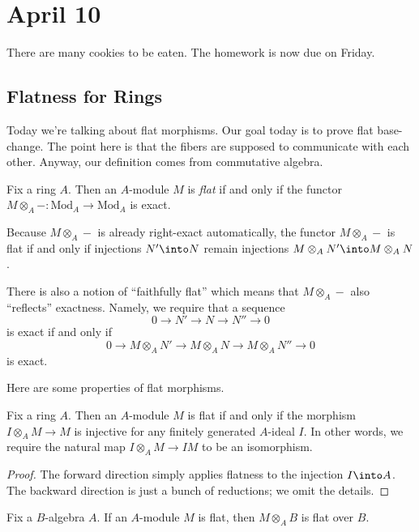 \documentclass[../notes.tex]{subfiles}
\begin{document}
\section{April 10}

There are many cookies to be eaten. The homework is now due on Friday.

\subsection{Flatness for Rings}
Today we're talking about flat morphisms. Our goal today is to prove flat base-change. The point here is that the fibers are supposed to communicate with each other. Anyway, our definition comes from commutative algebra.
\begin{definition}[flat]
	Fix a ring $A$. Then an $A$-module $M$ is \textit{flat} if and only if the functor $M\otimes_A-\colon\mathrm{Mod}_A\to\mathrm{Mod}_A$ is exact.
\end{definition}
\begin{remark}
	Because $M\otimes_A-$ is already right-exact automatically, the functor $M\otimes_A-$ is flat if and only if injections $N'\into N$ remain injections $M\otimes_AN'\into M\otimes_AN$.
\end{remark}
\begin{remark}
	There is also a notion of ``faithfully flat'' which means that $M\otimes_A-$ also ``reflects'' exactness. Namely, we require that a sequence
	\[0\to N'\to N\to N''\to0\]
	is exact if and only if
	\[0\to M\otimes_AN'\to M\otimes_AN\to M\otimes_AN''\to0\]
	is exact.
\end{remark}
Here are some properties of flat morphisms.
\begin{lemma} \label{lem:flatness-by-ideals}
	Fix a ring $A$. Then an $A$-module $M$ is flat if and only if the morphism $I\otimes_AM\to M$ is injective for any finitely generated $A$-ideal $I$. In other words, we require the natural map $I\otimes_AM\to IM$ to be an isomorphism.
\end{lemma}
\begin{proof}
	The forward direction simply applies flatness to the injection $I\into A$. The backward direction is just a bunch of reductions; we omit the details.
\end{proof}
\begin{lemma} \label{lem:flat-base-extension}
	Fix a $B$-algebra $A$. If an $A$-module $M$ is flat, then $M\otimes_AB$ is flat over $B$.
\end{lemma}
\end{document}
